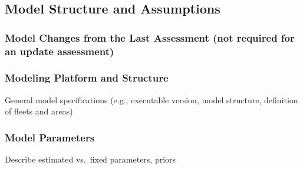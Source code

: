 \documentclass[11pt,
  english,
  a4paper,
]{article}
\begin{document}
\hypertarget{model-structure-and-assumptions}{%
\subsection{Model Structure and Assumptions}\label{model-structure-and-assumptions}}

\leavevmode\tagmcend\tagstructend


\hypertarget{model-changes-from-the-last-assessment-not-required-for-an-update-assessment}{%
\subsubsection{Model Changes from the Last Assessment (not required for an update assessment)}\label{model-changes-from-the-last-assessment-not-required-for-an-update-assessment}}

\leavevmode\tagmcend\tagstructend


\hypertarget{modeling-platform-and-structure}{%
\subsubsection{Modeling Platform and Structure}\label{modeling-platform-and-structure}}

\leavevmode\tagmcend\tagstructend


General model specifications (e.g., executable version, model structure, definition of fleets and areas)

\leavevmode\tagmcend\tagstructend\par


\hypertarget{model-parameters}{%
\subsubsection{Model Parameters}\label{model-parameters}}

\leavevmode\tagmcend\tagstructend


Describe estimated vs.~fixed parameters, priors

\leavevmode\tagmcend\tagstructend\par
\end{document}
